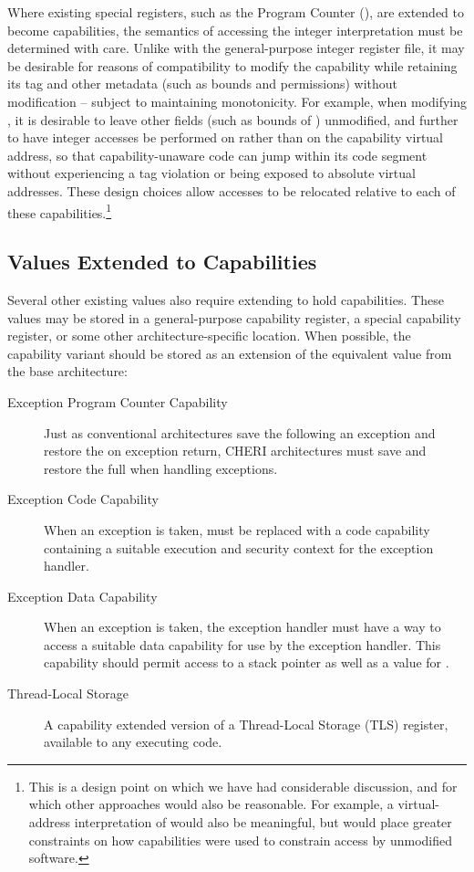 Where existing special registers, such as the Program Counter (\PC{}),
are extended to become capabilities, the
semantics of accessing the integer interpretation must be determined with
care.
Unlike with the general-purpose integer register file, it may be desirable for
reasons of compatibility to modify the capability while retaining its tag
and other metadata (such as bounds and permissions) without modification --
subject to maintaining monotonicity.
For example, when modifying \PC{}, it is desirable to leave other fields (such
as bounds of \PCC{}) unmodified, and further to have integer accesses be
performed on \coffset{} rather than on the capability virtual address, so that
capability-unaware code can jump within its code segment without experiencing
a tag violation or being exposed to absolute virtual addresses.
These design choices allow accesses to be relocated relative to each of
these capabilities.\footnote{This is a design point on which we have had
considerable discussion, and for which other approaches would also be
reasonable.
For example, a virtual-address interpretation of \PC{} would also be
meaningful, but would place greater constraints on how capabilities were
used to constrain access by unmodified software.}

\subsection{Values Extended to Capabilities}

Several other existing values also require extending to hold
capabilities.  These values may be stored in a general-purpose
capability register, a special capability register, or some other
architecture-specific location.  When possible, the capability variant
should be stored as an extension of the equivalent value from the base
architecture:

\begin{description}
\item[Exception Program Counter Capability] Just as conventional
  architectures save the \PC{} following an exception and restore the
  \PC{} on exception return, CHERI architectures must save and restore
  the full \PCC{} when handling exceptions.

\item[Exception Code Capability] When an exception is taken, \PCC{} must
  be replaced with a code capability containing a suitable
  execution and security context for the exception handler.

\item[Exception Data Capability] When an exception is taken, the
  exception handler must have a way to access a suitable data
  capability for use by the exception handler.  This capability should
  permit access to a stack pointer as well as a value for \DDC{}.

\item[Thread-Local Storage] A capability extended
  version of a Thread-Local Storage (TLS) register, available to any executing
  code.
\end{description}

